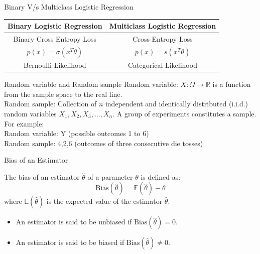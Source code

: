\documentclass[handout]{beamer}
\begin{document}
\begin{frame}{Binary V/s Multiclass Logistic Regression}
\begin{center}
    \begin{tabular}{|c|c|}
    \hline
    \textbf{Binary Logistic Regression} & \textbf{Multiclass Logistic Regression} \\
    \hline
    Binary Cross Entropy Loss& Cross Entropy Loss \\
    \pause
    $p(x) = \sigma(x^T\theta)$ & $p(x) = s(x^T\theta)$ \\
    \pause
    Bernoulli Likelihood & Categorical Likelihood\\
    \hline
  \end{tabular}
\end{center}    
\end{frame}

    \begin{frame}{Random variable and Random sample}
    Random variable: $X:\Omega\rightarrow\mathbb{R}$ is a function from the sample space to the real line. \\ 
    \addlinespace
    \addlinespace
    Random sample: Collection of $n$ independent and identically distributed (i.i.d.) random variables $X_1, X_2, X_3, \ldots, X_n$. A group of experiments constitutes a sample.\\
    \addlinespace
    \addlinespace
    For example:\\
    Random variable: Y (possible outcomes 1 to 6)\\
    Random sample: {4,2,6} (outcomes of three consecutive die tosses)
    \end{frame}

    \begin{frame}{Bias of an Estimator}
        \begin{tcolorbox}[colback=metropolisblue!5,colframe=metropolisblue,title=Bias of an Estimator]
            The bias of an estimator $\hat{\theta}$ of a parameter $\theta$ is defined as:
            \[
                \text{Bias}(\hat{\theta}) = \mathbb{E}(\hat{\theta}) - \theta
            \]
            where $\mathbb{E}(\hat{\theta})$ is the expected value of the estimator $\hat{\theta}$.
        \end{tcolorbox}
        \begin{itemize}
            \item An estimator is said to be unbiased if $\text{Bias}(\hat{\theta}) = 0$.
            \item An estimator is said to be biased if $\text{Bias}(\hat{\theta}) \neq 0$.
        \end{itemize}
        
    \end{frame}
    
\end{document}
